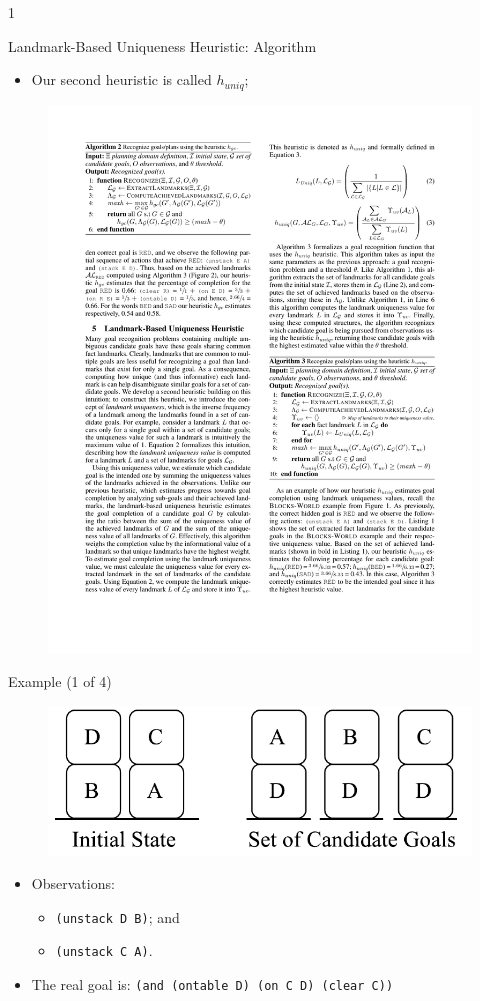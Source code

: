 \documentclass{beamer}
\def\masterclass{1}
\begin{document}
\if\masterclass1
    \begin{frame}{Landmark-Based Uniqueness Heuristic: Algorithm}
       	\begin{itemize}
       		\item Our second heuristic is called $h_{uniq}$; 
		\end{itemize}
		
		\begin{figure}[here]
			\centering
			\includegraphics[width=0.75\linewidth]{algo3-heuristic_uniqueness.pdf}
		\end{figure}			
    \end{frame}	
\fi

    \begin{frame}{Example (1 of 4)}
		\begin{figure}[here]
			\centering
			\includegraphics[width=0.75\linewidth]{example-blocksworld.pdf}
		\end{figure}
       	\begin{itemize}
       		\item Observations:
				\begin{itemize}
					\item \texttt{(unstack D B)}; and
					\item \texttt{(unstack C A)}.
				\end{itemize}
			\item The real goal is: \texttt{(and (ontable D) (on C D) (clear C))}
		\end{itemize}
    \end{frame}
\end{document}
